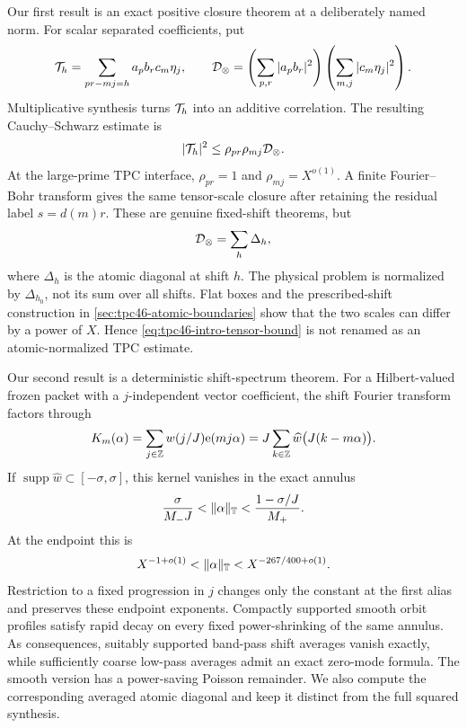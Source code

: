 Our first result is an exact positive closure theorem at a deliberately
named norm.  For scalar separated coefficients, put
\[
 \mathcal T_h=\sum_{pr-mj=h}a_pb_rc_m\eta_j,
 \qquad
 \mathcal D_\otimes=
 \left(\sum_{p,r}|a_pb_r|^2\right)
 \left(\sum_{m,j}|c_m\eta_j|^2\right).
\]
Multiplicative synthesis turns \(\mathcal T_h\) into an additive correlation.
The resulting Cauchy--Schwarz estimate is
\begin{equation}
 |\mathcal T_h|^2\le \rho_{pr}\rho_{mj}\mathcal D_\otimes.
 \label{eq:tpc46-intro-tensor-bound}
\end{equation}
At the large-prime TPC interface, \(\rho_{pr}=1\) and
\(\rho_{mj}=X^{o(1)}\).  A finite Fourier--Bohr transform gives the
same tensor-scale closure after retaining the residual label
\(s=d(m)r\).  These are genuine fixed-shift theorems, but
\begin{equation}
 \mathcal D_\otimes=\sum_h\Delta_h,
 \label{eq:tpc46-intro-diagonal-sum}
\end{equation}
where \(\Delta_h\) is the atomic diagonal at shift \(h\).  The
physical problem is normalized by \(\Delta_{h_0}\), not its sum over
all shifts.  Flat boxes and the prescribed-shift construction in
\cref{sec:tpc46-atomic-boundaries} show that the two scales can differ
by a power of \(X\).  Hence
\eqref{eq:tpc46-intro-tensor-bound} is not renamed as an
atomic-normalized TPC estimate.

Our second result is a deterministic shift-spectrum theorem.  For a
Hilbert-valued frozen packet with a \(j\)-independent vector coefficient,
the shift Fourier transform factors through
\begin{equation}
 K_m(\alpha)
 =\sum_{j\in\mathbb Z}w(j/J)\mathrm e(mj\alpha)
 =J\sum_{k\in\mathbb Z}\widehat w\bigl(J(k-m\alpha)\bigr).
 \label{eq:tpc46-intro-Poisson-kernel}
\end{equation}
If \(\operatorname{supp}\widehat w\subset[-\sigma,\sigma]\), this
kernel vanishes in the exact annulus
\begin{equation}
 \frac{\sigma}{M_-J}
 <\|\alpha\|_{\mathbb T}
 <\frac{1-\sigma/J}{M_+}.
 \label{eq:tpc46-intro-gap}
\end{equation}
At the endpoint this is
\[
 X^{-1+o(1)}<\|\alpha\|_{\mathbb T}<X^{-267/400+o(1)}.
\]
Restriction to a fixed progression in \(j\) changes only the constant
at the first alias and preserves these endpoint exponents.  Compactly
supported smooth orbit profiles satisfy rapid decay on every fixed
power-shrinking of the same annulus.  As consequences, suitably
supported band-pass shift averages vanish exactly, while sufficiently
coarse low-pass averages admit an exact zero-mode formula.  The smooth
version has a power-saving Poisson remainder.  We also compute the
corresponding averaged atomic diagonal and keep it distinct from the
full squared synthesis.

